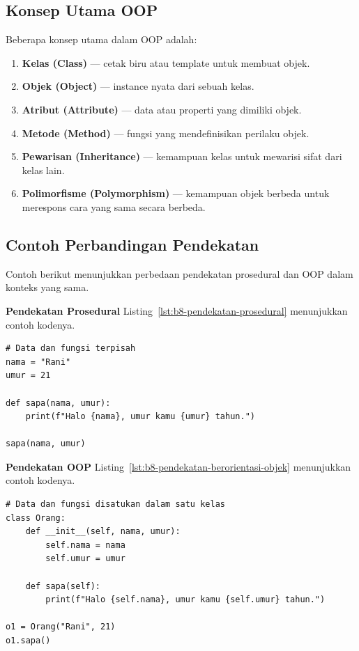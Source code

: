 \subsection*{Konsep Utama OOP}
Beberapa konsep utama dalam OOP adalah:
\begin{enumerate}
    \item \textbf{Kelas (Class)} — cetak biru atau template untuk membuat objek.
    \item \textbf{Objek (Object)} — instance nyata dari sebuah kelas.
    \item \textbf{Atribut (Attribute)} — data atau properti yang dimiliki objek.
    \item \textbf{Metode (Method)} — fungsi yang mendefinisikan perilaku objek.
    \item \textbf{Pewarisan (Inheritance)} — kemampuan kelas untuk mewarisi sifat dari kelas lain.
    \item \textbf{Polimorfisme (Polymorphism)} — kemampuan objek berbeda untuk merespons cara yang sama secara berbeda.
\end{enumerate}

\subsection*{Contoh Perbandingan Pendekatan}
Contoh berikut menunjukkan perbedaan pendekatan prosedural dan OOP dalam konteks yang sama.

\noindent\textbf{Pendekatan Prosedural}
Listing~\ref{lst:b8-pendekatan-prosedural} menunjukkan contoh kodenya.

\begin{lstlisting}[style=PythonStyle, caption={Pendekatan Prosedural}, label={lst:b8-pendekatan-prosedural}]
# Data dan fungsi terpisah
nama = "Rani"
umur = 21

def sapa(nama, umur):
    print(f"Halo {nama}, umur kamu {umur} tahun.")

sapa(nama, umur)
\end{lstlisting}

\noindent\textbf{Pendekatan OOP}
Listing~\ref{lst:b8-pendekatan-berorientasi-objek} menunjukkan contoh kodenya.

\begin{lstlisting}[style=PythonStyle, caption={Pendekatan Berorientasi Objek}, label={lst:b8-pendekatan-berorientasi-objek}]
# Data dan fungsi disatukan dalam satu kelas
class Orang:
    def __init__(self, nama, umur):
        self.nama = nama
        self.umur = umur

    def sapa(self):
        print(f"Halo {self.nama}, umur kamu {self.umur} tahun.")

o1 = Orang("Rani", 21)
o1.sapa()
\end{lstlisting}

